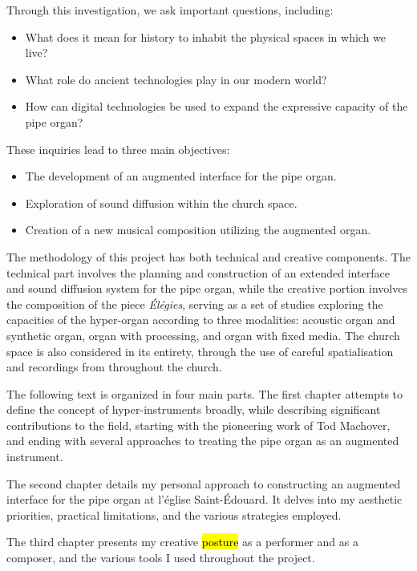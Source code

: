 \documentclass[12pt,twoside,maitrise]{dms_ks}
\theoremstyle{definition}
\begin{document}
Through this investigation, we ask important questions, including:
\begin{itemize}
    \item What does it mean for history to inhabit the physical spaces in which we live?
    \item What role do ancient technologies play in our modern world?
    \item How can digital technologies be used to expand the expressive capacity of the pipe organ?
\end{itemize}

These inquiries lead to three main objectives:
\begin{itemize}
    \item The development of an augmented interface for the pipe organ.
    \item Exploration of sound diffusion within the church space.
    \item Creation of a new musical composition utilizing the augmented organ.
\end{itemize}

The methodology of this project has both technical and creative components. 
The technical part involves the planning and construction of an extended interface and sound diffusion system for the pipe organ, while the creative portion involves the composition of the piece \textit{Élégies}, serving as a set of studies exploring the capacities of the hyper-organ according to three modalities: acoustic organ and synthetic organ, organ with processing, and organ with fixed media. 
The church space is also considered in its entirety, through the use of careful spatialisation and recordings from throughout the church.									

The following text is organized in four main parts. 
The first chapter attempts to define the concept of hyper-instruments broadly, while describing significant contributions to the field, starting with the pioneering work of Tod Machover, and ending with several approaches to treating the pipe organ as an augmented instrument.

The second chapter details my personal approach to constructing an augmented interface for the pipe organ at l’église Saint-Édouard. 
It delves into my aesthetic priorities, practical limitations, and the various strategies employed. 

The third chapter presents my creative \hl{posture} as a performer and as a composer, and the various tools I used throughout the project. 
\end{document}
